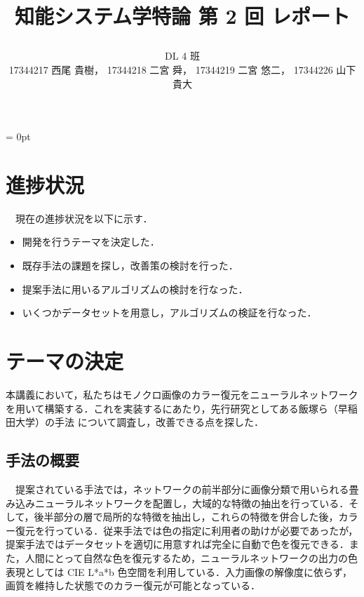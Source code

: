 \documentclass[10pt]{jarticle}
\title{\vspace{-20truemm}
{\normalsize \rightline{2017 年\ 6月\ 26日}}  %
{\Large 知能システム学特論 第 2 回 レポート\\} %
\date{}
\vspace{-3truemm}}
\author{
DL 4 班 \\
17344217 西尾 貴樹，
17344218 二宮 舜，
17344219 二宮 悠二，
17344226 山下 貴大
} %
\begin{document}
\parindent = 0pt %
\maketitle
\vspace{-1.0cm}
\section{進捗状況}
\ \ 現在の進捗状況を以下に示す．
\begin{itemize}
\item 開発を行うテーマを決定した．
\item 既存手法の課題を探し，改善策の検討を行った．
\item 提案手法に用いるアルゴリズムの検討を行なった．
\item いくつかデータセットを用意し，アルゴリズムの検証を行なった．
\end{itemize}
\section{テーマの決定}
本講義において，私たちはモノクロ画像のカラー復元をニューラルネットワークを用いて構築する．これを実装するにあたり，先行研究としてある飯塚ら（早稲田大学）の手法 \cite{waseda} について調査し，改善できる点を探した．
\vspace{-0.4cm}
\subsection{手法の概要}
\ \ 提案されている手法では，ネットワークの前半部分に画像分類で用いられる畳み込みニューラルネットワークを配置し，大域的な特徴の抽出を行っている．そして，後半部分の層で局所的な特徴を抽出し，これらの特徴を併合した後，カラー復元を行っている．従来手法では色の指定に利用者の助けが必要であったが，提案手法ではデータセットを適切に用意すれば完全に自動で色を復元できる．また，人間にとって自然な色を復元するため，ニューラルネットワークの出力の色表現としては CIE L*a*b 色空間を利用している．入力画像の解像度に依らず，画質を維持した状態でのカラー復元が可能となっている．
\vspace{-0.2cm}
\end{document}
